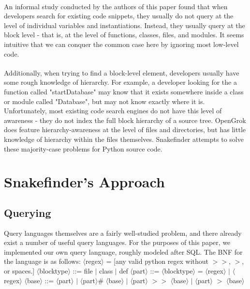 \documentclass{article}
\begin{document}
\paragraph{}
An informal study conducted by the authors of this paper found that when developers search for existing code snippets, they usually do not query at the level of individual variables and instantiations. Instead, they usually query at the block level - that is, at the level of functions, classes, files, and modules. It seems intuitive that we can conquer the common case here by ignoring most low-level code.

\paragraph{}
Additionally, when trying to find a block-level element, developers usually have some rough knowledge of hierarchy. For example, a developer looking for the a function called "startDatabase" may know that it exists somewhere inside a class or module called "Database", but may not know exactly where it is. Unfortunately, most existing code search engines do not have this level of awareness - they do not index the full block hierarchy of a source tree. OpenGrok does feature hierarchy-awareness at the level of files and directories, but has little knowledge of hierarchy within the files themselves. Snakefinder attempts to solve these majority-case problems for Python source code.

\section{Snakefinder's Approach}
\subsection{Querying}
Query languages themselves are a fairly well-studied problem, and there already exist a number of useful query languages. For the purposes of this paper, we implemented our own query language, roughly modeled after SQL. The BNF for the language is as follows:\newline
\newline
$\langle$regex$\rangle$ = [any valid python regex without $>>$, $>$, or spaces.]
\newline
$\langle$blocktype$\rangle$ ::= file $|$ class $|$ def
\newline
$\langle$part$\rangle$ ::= $\langle$blocktype$\rangle$ = $\langle$regex$\rangle$ $|$ $\langle$regex$\rangle$
\newline
$\langle$base$\rangle$ ::= $\langle$part$\rangle$ $|$ $\langle$part$\rangle$\# $\langle$base$\rangle$ $|$ $\langle$part$\rangle$ $>>$ $\langle$base$\rangle$ $|$ $\langle$part$\rangle$ $>$ $\langle$base$\rangle$
\newline
\end{document}
